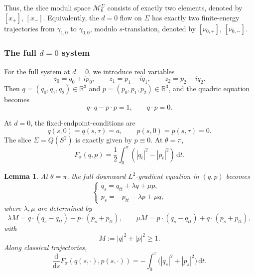 \documentclass[11pt]{amsart}
\theoremstyle{plain}
\newtheorem{lem}[thm]{Lemma}
\theoremstyle{definition}
\newcommand{\R}{\mathbb{R}}
\newcommand{\dd}{\mathrm d}
\begin{document}
Thus, the slice moduli space $\mathcal{M}_0^{\Sigma}$ consists of exactly two elements, denoted by $[x_+]$, $[x_-]$. Equivalently, the $d=0$ flow on $\Sigma$ has exactly two finite-energy trajectories from $\gamma_{1,0}$ to $\gamma_{0,0}$, modulo $s$-translation, denoted by $[\nu_{0,+}]$, $[\nu_{0,-}]$.


\subsubsection{The full $d=0$ system}\label{subsec:full-d=0}
For the full system at $d=0$, we introduce real variables
\[
z_0=q_0+ip_0,
\qquad
z_1=p_1-iq_1,
\qquad
z_2=p_2-iq_2.
\]
Then $q=(q_0,q_1,q_2)\in \R^3$ and $p=(p_0,p_1,p_2)\in \R^3$, and the quadric equation becomes
\begin{equation}\label{eq:qp-constraints}
q\cdot q-p\cdot p=1,
\qquad
q\cdot p=0.
\end{equation}

At $d=0$, the fixed-endpoint-conditions are
\begin{equation}\label{eq:qp-boundary}
q(s,0)=q(s,\tau)=a,
\qquad
p(s,0)=p(s,\tau)=0.
\end{equation}
The slice $\Sigma=Q(S^2)$ is exactly given by $p\equiv 0$. At $\theta=\pi$, 
   \[F_{\pi}(q,p)=\frac{1}{2}\int_0^{\pi}(|q_t|^2-|p_t|^2)\,\dd t.\]




\begin{lem}\label{lem:qp-full-flow}
At $\theta=\pi$, the full downward $L^2$-gradient equation in $(q,p)$ becomes
\begin{equation}
\label{eq:qp-full-flow}
\begin{cases}
 q_s=q_{tt}+\lambda q+\mu p,\\
 p_s=-p_{tt}-\lambda p+\mu q,
\end{cases}
\end{equation}
where $\lambda,\mu$ are determined by
\begin{equation}
\label{eq:lambda-mu-pi}
\lambda M=q\cdot(q_s-q_{tt})- p\cdot(p_s+p_{tt}),
\qquad\mu M=p\cdot(q_s-q_{tt})+q\cdot(p_s+p_{tt}),
\end{equation}
with
\[
 M:=|q|^2+|p|^2\geq 1.
\]
Along classical trajectories,
\[
\frac{\dd}{\dd s}F_\pi(q(s,\cdot),p(s,\cdot))=
-\int_0^\tau \bigl(|q_s|^2+|p_s|^2\bigr)\,\dd t .
\]
\end{lem}
\end{document}
